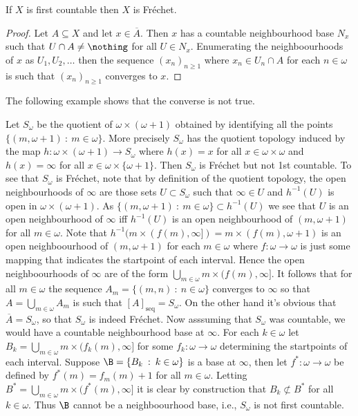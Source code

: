 \documentclass{article}
\newcommand{\seqcl}[1]{{[#1]_{\text{seq}}}}
\begin{document}
\begin{prop}
    If \(X\) is first countable then \(X\) is Fréchet.
\end{prop}
\begin{proof}
    Let \(A \subseteq X\) and let \(x \in \overline{A}\). Then \(x\) has a countable neighbourhood base \(N_x\) such that \(U \cap A \neq \nothing\) for all \(U \in N_x\). Enumerating the neighboourhoods of \(x\) as \(U_1, U_2, \dots\) then the sequence \((x_n)_{n \ge 1}\) where \(x_n \in U_n \cap A\) for each \(n \in \omega\) is such that \((x_n)_{n \ge 1}\) converges to \(x\).
\end{proof}
The following example shows that the converse is not true. 
\begin{exam}
    Let \(S_{\omega}\) be the quotient of \(\omega \times (\omega + 1)\) obtained by identifying all the points \(\{(m, \omega + 1) \: : \: m \in \omega\}\). More precisely \(S_{\omega}\) has the quotient topology induced by the map \(h: \omega \times (\omega + 1) \to S_{\omega}\) where \(h(x) = x\) for all \(x \in \omega \times \omega\) and \(h(x) = \infty\) for all \(x \in \omega \times \{\omega + 1\}\). Then \(S_{\omega}\) is Fréchet but not 1st countable. To see that \(S_{\omega}\) is Fréchet, note that by definition of the quotient topology, the open neighbourhoods of \(\infty\) are those sets \(U \subset S_{\omega}\) such that \(\infty \in U\) and \(h^{-1}(U)\) is open in \(\omega \times (\omega + 1)\). As \(\{(m, \omega + 1) \: : \:  m \in \omega\} \subset h^{-1}(U)\) we see that \(U\) is an open neighbourhood of \(\infty\) iff \(h^{-1}(U)\) is an open neighbourhood of \((m, \omega + 1)\) for all \(m \in \omega\).  Note that  \(h^{-1}(m \times (f(m), \infty]) = m \times (f(m), \omega + 1)\) is an open neighboourhood of \((m, \omega + 1)\) for each \(m \in \omega\) where \(f: \omega \to \omega\) is just some mapping that indicates the startpoint of each interval. Hence the open neighboourhoods of \(\infty\) are of the form \(\bigcup_{m \in \omega}m \times (f(m), \infty]\). It follows that for all \(m \in \omega\) the sequence \(A_m = \{(m, n) \: : \: n \in \omega\}\) converges to \(\infty\) so that \(A = \bigcup_{m \in \omega}A_m\) is such that \(\seqcl{A} = S_{\omega}\). On the other hand it's obvious that \(\overline{A} = S_{\omega}\), so that \(S_{\omega}\) is indeed Fréchet. Now asssuming that \(S_{\omega}\) was countable, we would have a countable neighbourhood base at \(\infty\). For each \(k \in \omega\) let \(B_k = \bigcup_{m \in \omega}m \times (f_k(m), \infty]\) for some \(f_k: \omega \to \omega\) determining the startpoints of each interval. Suppose \(\B = \{B_k \: : \: k \in \omega\}\) is a base at \(\infty\), then let \(f^{\ast}: \omega \to \omega\) be defined by \(f^{\ast}(m) = f_m(m) + 1\) for all \(m \in \omega\). Letting \(B^{\ast} = \bigcup_{m \in \omega}m \times (f^{\ast}(m), \infty]\) it is clear by construction that \(B_k \not\subset B^{\ast}\) for all \(k \in \omega\). Thus \(\B\) cannot be a neighboourhood base, i.e., \(S_{\omega}\) is not first countable.
    
\end{exam}
\end{document}
